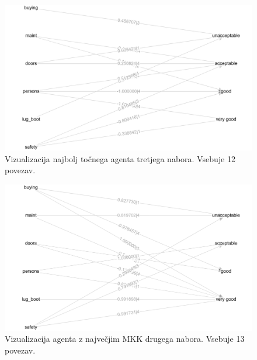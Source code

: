 \begin{figure}[H]
    \begin{center}
        \includegraphics[width=13cm]{car/3/acc_g}
    \end{center}
    \caption{Vizualizacija najbolj točnega agenta tretjega nabora. Vsebuje 12 povezav.}
    \label{fig:car_acc_3_g}
\end{figure}

\begin{figure}[H]
    \begin{center}
        \includegraphics[width=13cm]{car/3/mcc_g}
    \end{center}
    \caption{Vizualizacija agenta z največjim MKK drugega nabora. Vsebuje 13 povezav.}
    \label{fig:car_mcc_3_g}
\end{figure}